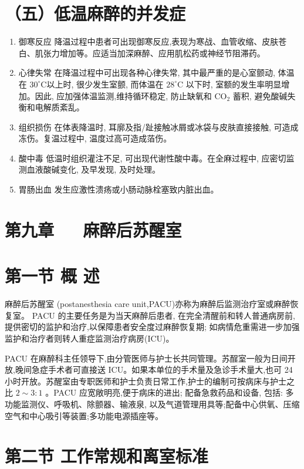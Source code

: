 \documentclass[10pt]{article}
\begin{document}
\section*{（五）低温麻醉的并发症}
\begin{enumerate}
  \item 御寒反应 降温过程中患者可出现御寒反应,表现为寒战、血管收缩、皮肤苍白、肌张力增加等。应适当加深麻醉、应用肌松药或神经节阻滞药。

  \item 心律失常 在降温过程中可出现各种心律失常, 其中最严重的是心室颤动, 体温在 $30^{\circ} \mathrm{C}$以上时, 很少发生室颤, 而体温在 $28^{\circ} \mathrm{C}$ 以下时, 室额的发生率明显增加。因此, 应加强体温监测,维持循环稳定, 防止缺氧和 $\mathrm{CO}_{2}$ 蓄积, 避免酸碱失衡和电解质紊乱。

  \item 组织损伤 在体表降温时, 耳廓及指/趾接触冰屑或冰袋与皮肤直接接触, 可造成冻伤。复温过程中, 温度过高可造成萡伤。

  \item 酸中毒 低温时组织灌注不足, 可出现代谢性酸中毒。在全麻过程中, 应密切监测血液酸碱变化, 及早发现, 及时处理。

  \item 胃肠出血 发生应激性溃疡或小肠动脉栓塞致内脏出血。

\end{enumerate}

\section*{第九章 $\quad$ 麻醉后苏醒室}
\section*{第一节 概 述}
麻醉后苏醒室 (postanesthesia care unit,PACU)亦称为麻醉后监测治疗室或麻醉恢复室。 PACU 的主要任务是为当天麻醉后患者, 在完全清醒前和转人普通病房前, 提供密切的监护和治疗,以保障患者安全度过麻醉恢复期; 如病情危重需进一步加强监护和治疗者则转人重症监测治疗病房(ICU)。

PACU 在麻醉科主任领导下,由分管医师与护士长共同管理。苏酲室一般为日间开放,晚间急症手术者可直接送 ICU。如果本单位的手术量及急诊手术量大,也可 24 小时开放。苏醒室由专职医师和护士负责日常工作,护士的编制可按病床与护士之比 $2 \sim 3: 1$ 。PACU 应宽敞明亮,便于病床的进出; 配备急救药品和设备, 包括: 多功能监测仪、呼吸机、除颤器、输液泉, 以及气道管理用具等;配备中心供氧、压缩空气和中心吸引等装置;多功能电源插座等。

\section*{第二节 工作常规和离室标准}
\end{document}

